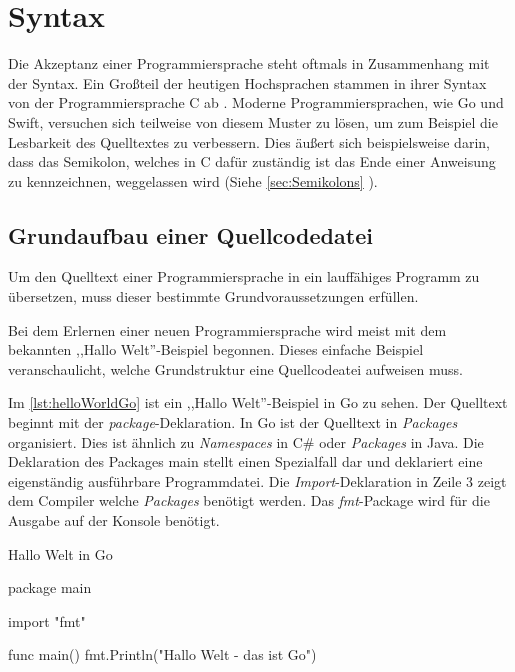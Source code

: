 \chapter{Syntax}
Die Akzeptanz einer Programmiersprache steht oftmals in Zusammenhang mit der Syntax. 
Ein Großteil der heutigen Hochsprachen stammen in ihrer Syntax von der Programmiersprache C ab \cite{Wikipedia.ListProgrammingLanguages}. 
Moderne Programmiersprachen, wie Go und Swift, versuchen sich teilweise von diesem Muster zu lösen, um zum Beispiel die Lesbarkeit des Quelltextes zu verbessern.
Dies äußert sich beispielsweise darin, dass das Semikolon, welches in C dafür zuständig ist das Ende einer Anweisung zu kennzeichnen, weggelassen wird (Siehe \autoref{sec:Semikolons} ).

\section{Grundaufbau einer Quellcodedatei}
Um den Quelltext einer Programmiersprache in ein lauffähiges Programm zu übersetzen, muss dieser bestimmte Grundvoraussetzungen erfüllen.

Bei dem Erlernen einer neuen Programmiersprache wird meist mit dem bekannten ,,Hallo Welt''-Beispiel begonnen.
Dieses einfache Beispiel veranschaulicht, welche Grundstruktur eine Quellcodeatei aufweisen muss.

Im \autoref{lst:helloWorldGo} ist ein ,,Hallo Welt''-Beispiel in Go zu sehen.
Der Quelltext beginnt mit der \emph{package}-Deklaration.
In Go ist der Quelltext in \emph{Packages} organisiert. 
Dies ist ähnlich zu \emph{Namespaces} in C\# oder \emph{Packages} in Java.
Die Deklaration des Packages main stellt einen Spezialfall dar und deklariert eine eigenständig ausführbare Programmdatei.
Die \emph{Import}-Deklaration in Zeile 3 zeigt dem Compiler welche \emph{Packages} benötigt werden.
Das \emph{fmt}-Package wird für die Ausgabe auf der Konsole benötigt.

\begin{listing}[H]
\caption{Hallo Welt in Go}
\label{lst:helloWorldGo}
\begin{GoCode}
package main

import "fmt"

func main() {
    fmt.Println("Hallo Welt - das ist Go")
}
\end{GoCode}
\end{listing}

